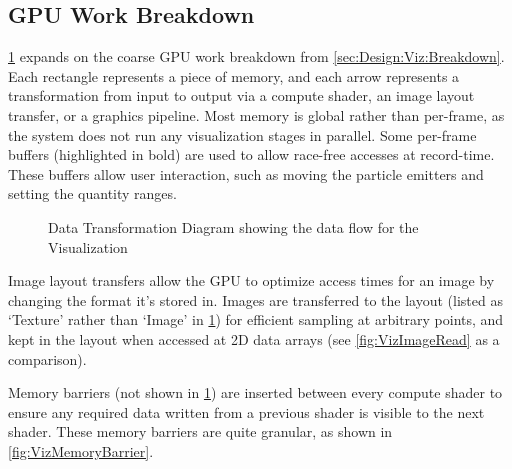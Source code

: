 \subsection{GPU Work Breakdown}
\cref{fig:VizDataTransform} expands on the coarse GPU work breakdown from \cref{sec:Design:Viz:Breakdown}.
Each rectangle represents a piece of memory, and each arrow represents a transformation from input to output via a compute shader, an image layout transfer, or a graphics pipeline.
Most memory is global rather than per-frame, as the system does not run any visualization stages in parallel.
Some per-frame buffers (highlighted in bold) are used to allow race-free accesses at record-time.
These buffers allow user interaction, such as moving the particle emitters and setting the quantity ranges.
\pagebreak
{}
\begin{figure}
    \centering
    \caption{Data Transformation Diagram showing the data flow for the Visualization}
    \label{fig:VizDataTransform}
\end{figure}
\restoregeometry
\pagebreak

Image layout transfers allow the GPU to optimize access times for an image by changing the format it's stored in.
Images are transferred to the  layout (listed as `Texture' rather than `Image' in \cref{fig:VizDataTransform}) for efficient sampling at arbitrary points, and kept in the  layout when accessed at 2D data arrays (see \cref{fig:VizImageRead} as a comparison).

Memory barriers (not shown in \cref{fig:VizDataTransform}) are inserted between every compute shader to ensure any required data written from a previous shader is visible to the next shader\cite{TheKhronosGroupVulkanSpec}. %
These memory barriers are quite granular, as shown in \cref{fig:VizMemoryBarrier}.

